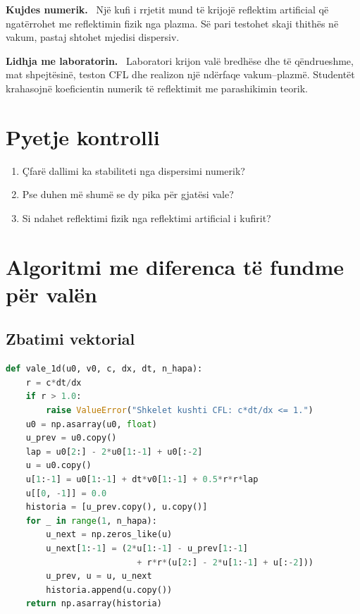 \documentclass[11pt,oneside,openany]{book}
\newenvironment{kujdes}{\par\medskip\noindent\textbf{Kujdes numerik.}\ }{\par\medskip}
\newenvironment{lidhje}{\par\medskip\noindent\textbf{Lidhja me laboratorin.}\ }{\par\medskip}
\begin{document}
\begin{kujdes}
Një kufi i rrjetit mund të krijojë reflektim artificial që ngatërrohet me reflektimin fizik nga plazma. Së pari testohet skaji thithës në vakum, pastaj shtohet mjedisi dispersiv.
\end{kujdes}

\begin{lidhje}
Laboratori krijon valë bredhëse dhe të qëndrueshme, mat shpejtësinë, teston CFL dhe realizon një ndërfaqe vakum--plazmë. Studentët krahasojnë koeficientin numerik të reflektimit me parashikimin teorik.
\end{lidhje}

\section*{Pyetje kontrolli}
\begin{enumerate}
\item Çfarë dallimi ka stabiliteti nga dispersimi numerik?
\item Pse duhen më shumë se dy pika për gjatësi vale?
\item Si ndahet reflektimi fizik nga reflektimi artificial i kufirit?
\end{enumerate}

\section{Algoritmi me diferenca të fundme për valën}
\subsection{Zbatimi vektorial}
\begin{lstlisting}[language=Python,caption={Skema eksplicite e valës me skaje të fiksuara.}]
def vale_1d(u0, v0, c, dx, dt, n_hapa):
    r = c*dt/dx
    if r > 1.0:
        raise ValueError("Shkelet kushti CFL: c*dt/dx <= 1.")
    u0 = np.asarray(u0, float)
    u_prev = u0.copy()
    lap = u0[2:] - 2*u0[1:-1] + u0[:-2]
    u = u0.copy()
    u[1:-1] = u0[1:-1] + dt*v0[1:-1] + 0.5*r*r*lap
    u[[0, -1]] = 0.0
    historia = [u_prev.copy(), u.copy()]
    for _ in range(1, n_hapa):
        u_next = np.zeros_like(u)
        u_next[1:-1] = (2*u[1:-1] - u_prev[1:-1]
                          + r*r*(u[2:] - 2*u[1:-1] + u[:-2]))
        u_prev, u = u, u_next
        historia.append(u.copy())
    return np.asarray(historia)
\end{lstlisting}
\end{document}

